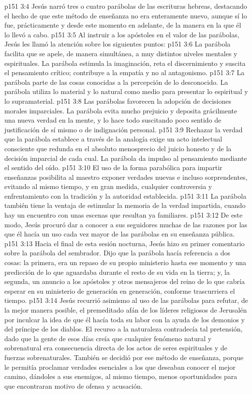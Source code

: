 \vs p151 3:4 Jesús narró tres o cuatro parábolas de las escrituras hebreas, destacando el hecho de que este método de enseñanza no era enteramente nuevo, aunque sí lo fue, prácticamente y desde este momento en adelante, de la manera en la que él lo llevó a cabo.
\vs p151 3:5 Al instruir a los apóstoles en el valor de las parábolas, Jesús les llamó la atención sobre los siguientes puntos:
\vs p151 3:6 La parábola facilita que se apele, de manera simultánea, a muy distintos niveles mentales y espirituales. La parábola estimula la imaginación, reta el discernimiento y suscita el pensamiento crítico; contribuye a la empatía y no al antagonismo.
\vs p151 3:7 La parábola parte de las cosas conocidas a la percepción de lo desconocido. La parábola utiliza lo material y lo natural como medio para presentar lo espiritual y lo supramaterial.
\vs p151 3:8 Las parábolas favorecen la adopción de decisiones morales imparciales. La parábola evita mucho prejuicio y deposita grácilmente una nueva verdad en la mente, y lo hace todo suscitando poco sentido de justificación de sí mismo o de indignación personal.
\vs p151 3:9 Rechazar la verdad que la parábola establece a través de la analogía exige un acto intelectual consciente que redunda en el absoluto menosprecio del juicio honesto y de la decisión imparcial de cada cual. La parábola da impulso al pensamiento mediante el sentido del oído.
\vs p151 3:10 El uso de la forma parabólica para impartir enseñanzas posibilita al maestro exponer verdades nuevas e incluso sorprendentes, evitando al mismo tiempo, y en gran medida, cualquier controversia y enfrentamiento con la tradición y la autoridad establecida.
\vs p151 3:11 La parábola también tiene la ventaja de estimular la memoria de la verdad impartida, cuando hay un encuentro con unas escenas que resultan ya familiares.
\vs p151 3:12 \pc De este modo, Jesús procuró dar a conocer a sus seguidores muchas de las razones por las que él hacía un uso cada vez mayor de las parábolas en su enseñanza pública.
\vs p151 3:13 \pc Hacia el final de esta sesión nocturna, Jesús hizo su primer comentario sobre la parábola del sembrador. Dijo que la parábola hacía referencia a dos cosas: la primera, era un repaso de su propio ministerio hasta ese momento y una predicción de lo que aguardaba durante el resto de su vida en la tierra; y, la segunda, un anuncio a los apóstoles y otros mensajeros del reino de lo que cabría esperar en su ministerio de generación en generación, conforme trascurriera el tiempo.
\vs p151 3:14 Jesús recurrió asimismo al uso de las parábolas para refutar, de la mejor manera posible, el premeditado afán de los líderes religiosos de Jerusalén por inculcar la idea de que él hacía toda su labor con la ayuda de los demonios y del príncipe de los diablos. El recurso a la naturaleza contradecía tal pretensión, dado que la gente de esos días creía que cualquier fenómeno natural y sobrenatural era consecuencia directa de los actos de seres espirituales y de fuerzas sobrenaturales. También se decidió por ese método de enseñanza, porque le permitía proclamar verdades esenciales a los que deseaban conocer el mejor camino, dándoles a sus enemigos, al mismo tiempo, menos oportunidades para que encontraran motivo de ofensa y acusación.
